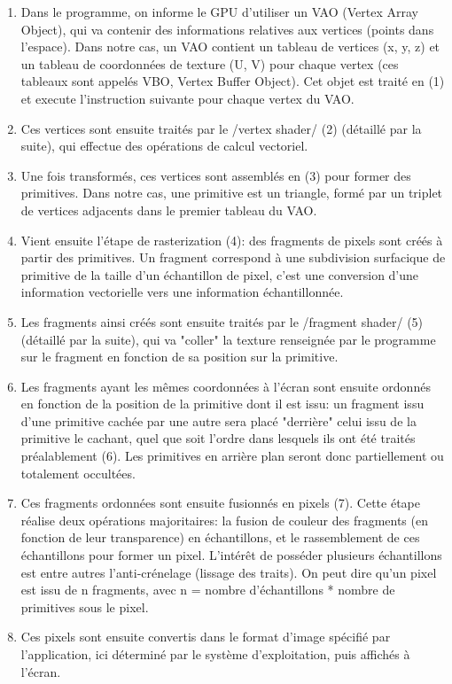 \begin{enumerate}
 \item Dans le programme, on informe le GPU d'utiliser un VAO (Vertex Array Object), qui va contenir des informations relatives aux vertices (points dans l'espace). Dans notre cas, un VAO contient un tableau de vertices (x, y, z) et un tableau de coordonnées de texture (U, V) pour chaque vertex (ces tableaux sont appelés VBO, Vertex Buffer Object). Cet objet est traité en (1) et execute l'instruction suivante pour chaque vertex du VAO.
 \item Ces vertices sont ensuite traités par le /vertex shader/ (2) (détaillé par la suite), qui effectue des opérations de calcul vectoriel.
 \item Une fois transformés, ces vertices sont assemblés en (3) pour former des primitives. Dans notre cas, une primitive est un triangle, formé par un triplet de vertices adjacents dans le premier tableau du VAO.
 \item Vient ensuite l'étape de rasterization (4): des fragments de pixels sont créés à partir des primitives. Un fragment correspond à une subdivision surfacique de primitive de la taille d'un échantillon de pixel, c'est une conversion d'une information vectorielle vers une information échantillonnée.
 \item Les fragments ainsi créés sont ensuite traités par le /fragment shader/ (5) (détaillé par la suite), qui va "coller" la texture renseignée par le programme sur le fragment en fonction de sa position sur la primitive.
 \item Les fragments ayant les mêmes coordonnées à l'écran sont ensuite ordonnés en fonction de la position de la primitive dont il est issu: un fragment issu d'une primitive cachée par une autre sera placé "derrière" celui issu de la primitive le cachant, quel que soit l'ordre dans lesquels ils ont été traités préalablement (6). Les primitives en arrière plan seront donc partiellement ou totalement occultées.
 \item Ces fragments ordonnées sont ensuite fusionnés en pixels (7). Cette étape réalise deux opérations majoritaires: la fusion de couleur des fragments (en fonction de leur transparence) en échantillons, et le rassemblement de ces échantillons pour former un pixel. L’intérêt de posséder plusieurs échantillons est entre autres l'anti-crénelage (lissage des traits). On peut dire qu'un pixel est issu de n fragments, avec n = nombre d'échantillons * nombre de primitives sous le pixel.
 \item Ces pixels sont ensuite convertis dans le format d'image spécifié par l'application, ici déterminé par le système d'exploitation, puis affichés à  l'écran.
\end{enumerate}

